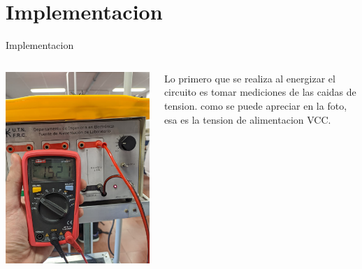 \section{Implementacion}
\begin{frame}{Implementacion}

\end{frame}

\begin{frame}{}
  \begin{columns}[c] %
      \centering
      \includegraphics[width=\linewidth]{pictures/VCC.jpeg}

      \justifying
        Lo primero que se realiza al energizar el circuito es tomar mediciones de las caidas de tension. como se puede
        apreciar en la foto, esa es la tension de alimentacion VCC. 
      
  \end{columns}
\end{frame}

